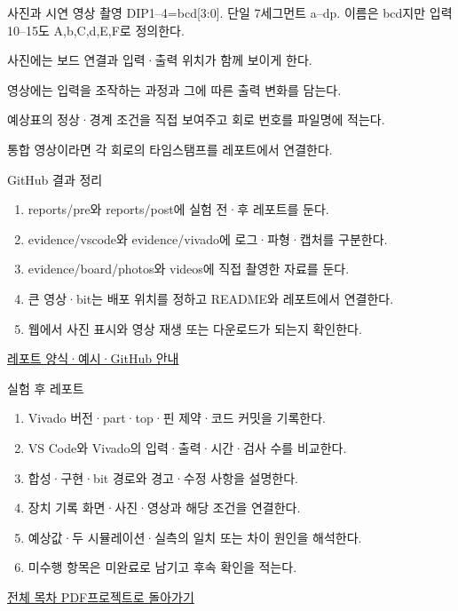 \begin{frame}{사진과 시연 영상 촬영}\relax
\small
DIP1–4=bcd[3:0]. 단일 7세그먼트 a–dp. 이름은 bcd지만 입력 10–15도 A,b,C,d,E,F로 정의한다.\par\vspace{0.22cm}사진에는 보드 연결과 입력·출력 위치가 함께 보이게 한다.\par\vspace{0.22cm}영상에는 입력을 조작하는 과정과 그에 따른 출력 변화를 담는다.\par\vspace{0.22cm}예상표의 정상·경계 조건을 직접 보여주고 회로 번호를 파일명에 적는다.\par\vspace{0.22cm}통합 영상이라면 각 회로의 타임스탬프를 레포트에서 연결한다.\par
\end{frame}

\begin{frame}{GitHub 결과 정리}\relax
\small
\begin{enumerate}\setlength{\itemsep}{0.22cm}
\item reports/pre와 reports/post에 실험 전·후 레포트를 둔다.
\item evidence/vscode와 evidence/vivado에 로그·파형·캡처를 구분한다.
\item evidence/board/photos와 videos에 직접 촬영한 자료를 둔다.
\item 큰 영상·bit는 배포 위치를 정하고 README와 레포트에서 연결한다.
\item 웹에서 사진 표시와 영상 재생 또는 다운로드가 되는지 확인한다.
\end{enumerate}
\href{https://github.com/Glaysia/ece2_26_2_2/blob/daily/0910/example/fpga_projects_hdl/LAB1/docs/reports.md}{레포트 양식·예시·GitHub 안내}
\end{frame}

\begin{frame}{실험 후 레포트}\relax
\small
\begin{enumerate}\setlength{\itemsep}{0.22cm}
\item Vivado 버전·part·top·핀 제약·코드 커밋을 기록한다.
\item VS Code와 Vivado의 입력·출력·시간·검사 수를 비교한다.
\item 합성·구현·bit 경로와 경고·수정 사항을 설명한다.
\item 장치 기록 화면·사진·영상과 해당 조건을 연결한다.
\item 예상값·두 시뮬레이션·실측의 일치 또는 차이 원인을 해석한다.
\item 미수행 항목은 미완료로 남기고 후속 확인을 적는다.
\end{enumerate}
\href{04.LAB1_00_CONTENTS.pdf}{전체 목차 PDF}\quad\href{https://github.com/Glaysia/fpga-lab-example-vivado-2026-1-10-seven-segment/tree/6cad34ce6d1385cd261b510024d50936dccb8f45}{프로젝트로 돌아가기}
\end{frame}
\endgroup

